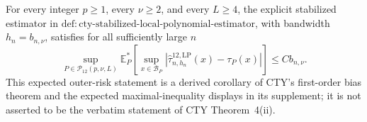 For every integer \(p\geq1\), every \(\nu\geq2\), and every \(L\geq4\), the explicit stabilized estimator in \(\mathrm{def:cty\text{-}stabilized\text{-}local\text{-}polynomial\text{-}estimator}\), with bandwidth \(h_n=b_{n,\nu}\), satisfies for all sufficiently large \(n\)
\[
 \sup_{P\in\mathcal P_{12}(p,\nu,L)}
 \mathbb E_P^*\!\left[
 \sup_{x\in\mathcal B_P}
 |\widehat\tau^{12,\mathrm{LP}}_{n,h_n}(x)-\tau_P(x)|
 \right]
 \leq Cb_{n,\nu}.
\]
This expected outer-risk statement is a derived corollary of CTY's first-order bias theorem and the expected maximal-inequality displays in its supplement; it is not asserted to be the verbatim statement of CTY Theorem~4(ii).